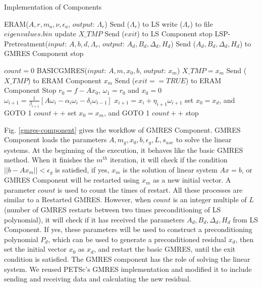 \begin{breakablealgorithm}
	\caption{Implementation of Components}   
	\label{alg:gmres/ls-a}   
	\begin{algorithmic}[1]
		\State ERAM($A, r, m_a, \nu,\epsilon_a$, $output$: $\Lambda_r$)
		\State Send ($\Lambda_r$) to LS
		\State write ($\Lambda_r$) to file $eigenvalues.bin$\EndIf
		\State update $X\_TMP$\EndIf
		\State Send ($exit$) to LS Component  \State stop \EndIf
		\EndWhile
		\EndFunction
		\State LSP-Pretreatment{($input$: $A,b,d,\Lambda_r$, $output$: $A_d, B_d, \Delta_d, H_d$)}
		\State Send ($A_d, B_d, \Delta_d, H_d$) to GMRES Component
		\EndIf
		\State stop \EndIf
		\EndFunction
		
		\State $count=0$
		\State BASICGMRES{($input$: $A, m, x_0,b$, $output$: $x_m$)}
		\State $X\_TMP = x_m$
		\State Send ($X\_TMP$) to ERAM Component
		\State \Return $x_m$
		\State Send ($exit==TRUE$) to ERAM Component
		\State Stop
		\Else {}
		\State $r_0=f-Ax_0$, $\omega_1 = r_0$ and $x_0=0$
		\State $\omega_{i+1}=\frac{1}{\beta_{i+1}}[A\omega_i-\alpha_i\omega_i-\delta_i\omega_{i-1}]$
		\State $x_{i+1}=x_i+\eta_{i+1}\omega_{i+1}$
		\EndFor
		\EndFor
		\State set $x_0=x_d$, and GOTO 1
		\State $count++$
		\EndIf
		\Else
		\State set $x_0=x_m$, and GOTO 1
		\State $count++$
		\EndIf
		\EndIf
		\State stop \EndIf
		\EndFunction
	\end{algorithmic}  
\end{breakablealgorithm}

Fig. \ref{gmres-component} gives the workflow of GMRES Component. GMRES Component loads the parameters $A, m_g, x_0, b, \epsilon_g, L, s_{use}$ to solve the linear systems. At the beginning of the execution, it behaves like the basic GMRES method. When it finishes the $m^{th}$ iteration, it will check if the condition $||b-Ax_m||<\epsilon_g$ is satisfied, if yes, $x_m$ is the solution of linear system $Ax=b$, or GMRES Component will be restarted using $x_m$ as a new initial vector. A parameter $count$ is used to count the times of restart. All these processes are similar to a Restarted GMRES. However, when $count$ is an integer multiple of $L$ (number of GMRES restarts between two times preconditioning of LS polynomial), it will check if it has received the parameters $A_d, B_d, \Delta_d, H_d$ from LS Component. If yes, these parameters will be used to construct a preconditioning polynomial $P_d$, which can be used to generate a preconditioned residual $x_d$, then set the initial vector $x_0$ as $x_d$, and restart the basic GMRES, until the exit condition is satisfied. The GMRES component has the role of solving the linear system.  We reused PETSc's GMRES implementation and modified it to include sending and receiving data and calculating the new residual. 

